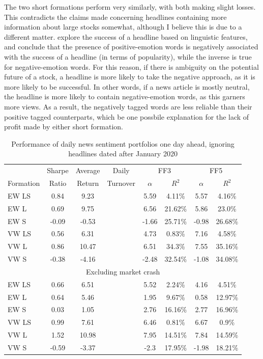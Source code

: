 The two short formations perform very similarly, with both making slight losses. This contradicts the claims made concerning headlines containing more information about large stocks somewhat, although I believe this is due to a different matter. \textcite{linguistic-effect-success} explore the success of a headline based on linguistic features, and conclude that the presence of positive-emotion words is negatively associated with the success of a headline (in terms of popularity), while the inverse is true for negative-emotion words. For this reason, if there is ambiguity on the potential future of a stock, a headline is more likely to take the negative approach, as it is more likely to be successful. In other words, if a news article is mostly neutral, the headline is more likely to contain negative-emotion words, as this garners more views. As a result, the negatively tagged words are less reliable than their positive tagged counterparts, which be one possbile explanation for the lack of profit made by either short formation.

\begin{table}[!ht]
\begin{center}
\begin{tabular}{lccccccc}
      \toprule
      & Sharpe &  Average & Daily & \multicolumn{2}{c}{FF3} & \multicolumn{2}{c}{FF5} \\
      \cmidrule(lr){5-6}
      \cmidrule(lr){7-8}
      Formation & Ratio & Return & Turnover & $\alpha$ & $R^2$ & $\alpha$ & $R^2$ \\
      \midrule
      EW LS & 0.84  & 9.23 & & 5.59 & 4.11\% & 5.57 & 4.16\% \\
      EW L  & 0.69  & 9.75 & & 6.56 & 21.62\% & 5.86 & 23.0\% \\
      EW S  & -0.09 & -0.53 & & -1.66 & 25.71\% & -0.98 & 26.68\% \\
      VW LS & 0.56  & 6.31 & & 4.73 & 0.83\% & 7.16 & 4.58\% \\
      VW L  & 0.86  & 10.47 & & 6.51 & 34.3\% & 7.55 & 35.16\% \\
      VW S  & -0.38 & -4.16 & & -2.48 & 32.54\% & -1.08 & 34.08\% \\
      \midrule
      \multicolumn{8}{c}{Excluding market crash} \\
      \midrule
      EW LS & 0.66  & 6.51 & & 5.52 & 2.24\% & 4.16 & 4.51\% \\
      EW L  & 0.64  & 5.46 & & 1.95 & 9.67\% & 0.58 & 12.97\% \\
      EW S  & 0.03  & 1.05 & & 2.76 & 16.16\% & 2.77 & 16.96\% \\
      VW LS & 0.99  & 7.61 & & 6.46 & 0.81\% & 6.67 & 0.9\% \\
      VW L  & 1.52  & 10.98 & & 7.95 & 14.51\% & 7.84 & 14.59\% \\
      VW S  & -0.59 & -3.37 & & -2.3 & 17.95\% & -1.98 & 18.21\% \\
      \bottomrule
\end{tabular}
\caption{Performance of daily news sentiment portfolios one day ahead, ignoring headlines dated after January 2020}
\label{tab:portfolio-performance-no-covid}
\end{center}
\end{table}

